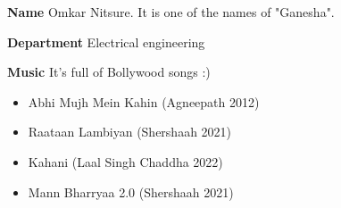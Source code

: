 \documentclass[10pt, letterpaper]{article}
\begin{document}
\newpage

\textbf{Name}
Omkar Nitsure. It is one of the names of "Ganesha". \par

\textbf{Department}
Electrical engineering \par

\textbf{Music}
It's full of Bollywood songs :)
\begin{itemize}
    \item Abhi Mujh Mein Kahin (Agneepath 2012)
    \item Raataan Lambiyan (Shershaah 2021)
    \item Kahani (Laal Singh Chaddha 2022)
    \item Mann Bharryaa 2.0 (Shershaah 2021)
\end{itemize}
\end{document}
